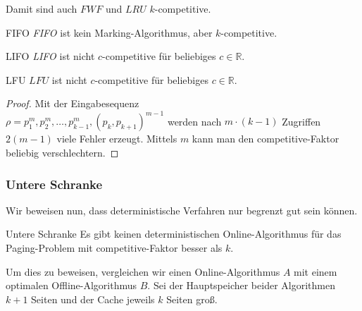 \documentclass{panikzettel}
\begin{document}
Damit sind auch $FWF$ und $LRU$ $k$-competitive.

\begin{halfboxl}
\vspace{-\baselineskip}
    \begin{theo}{FIFO}
        \textit{FIFO} ist kein Marking-Algorithmus, aber $k$-competitive.
    \end{theo}
\end{halfboxl}%
\begin{halfboxr}
\vspace{-\baselineskip}
    \begin{theo}{LIFO}
        \textit{LIFO} ist nicht $c$-competitive für beliebiges $c \in \mathbb{R}$.
    \end{theo}
\end{halfboxr}

\begin{halfboxl}
\vspace{-\baselineskip}
    \begin{theo}{LFU}
        $LFU$ ist nicht $c$-competitive für beliebiges $c \in \mathbb{R}$.
    \end{theo}
\end{halfboxl}%
\begin{halfboxr}
    \vspace{-\baselineskip}
    \begin{proof}
    Mit der Eingabesequenz \\$\rho=p_1^{m},p_2^{m},\dots,p_{k-1}^{m},(p_k,p_{k+1})^{m-1}$ werden nach $m \cdot (k-1)$ Zugriffen $2(m-1)$ viele Fehler erzeugt. Mittels $m$ kann man den competitive-Faktor beliebig verschlechtern.
    \end{proof}
\end{halfboxr}

\subsubsection{Untere Schranke}
Wir beweisen nun, dass deterministische Verfahren nur begrenzt gut sein können.

\begin{theo}{Untere Schranke}
    Es gibt keinen deterministischen Online-Algorithmus für das Paging-Problem mit competitive-Faktor besser als $k$.
\end{theo}

Um dies zu beweisen, vergleichen wir einen Online-Algorithmus $A$ mit einem optimalen Offline-Algorithmus $B$. Sei der Hauptspeicher beider Algorithmen $k+1$ Seiten und der Cache jeweils $k$ Seiten groß.
\end{document}
